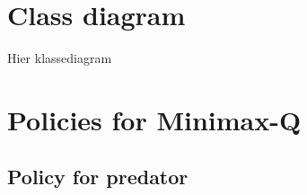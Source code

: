 \clearpage
\appendix
\appendixpage

\section{Class diagram} \label{app:classDiagram}

Hier klassediagram

\clearpage
\section{Policies for Minimax-Q} \label{app:policiesM}
\subsection{Policy for predator}
